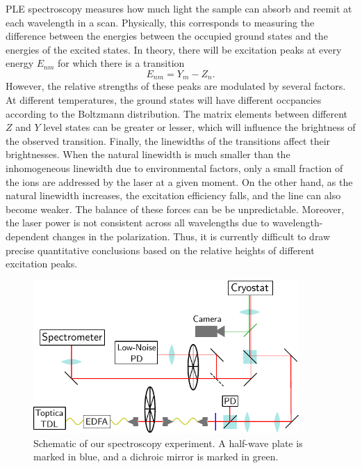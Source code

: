 \documentclass[12pt]{puthesis}
\begin{document}
PLE spectroscopy measures how much light the sample can absorb and reemit at each wavelength in a scan. Physically, this corresponds to measuring the difference between the energies between the occupied ground states and the energies of the excited states. In theory, there will be excitation peaks at every energy $E_{nm}$ for which there is a transition 
\begin{equation}\label{eq:6}
E_{nm} = Y_{m}-Z_{n}.
\end{equation}
However, the relative strengths of these peaks are modulated by several factors. At different temperatures, the ground states will have different occpancies according to the Boltzmann distribution. The matrix elements between different $Z$ and $Y$ level states can be greater or lesser, which will influence the brightness of the observed transition. Finally, the linewidths of the transitions affect their brightnesses. When the natural linewidth is much smaller than the inhomogeneous linewidth due to environmental factors, only a small fraction of the ions are addressed by the laser at a given moment. On the other hand, as the natural linewidth increases, the excitation efficiency falls, and the line can also become weaker. The balance of these forces can be be unpredictable. Moreover, the laser power is not consistent across all wavelengths due to wavelength-dependent changes in the polarization. Thus, it is currently difficult to draw precise quantitative conclusions based on the relative heights of different excitation peaks. 

\begin{figure}[t]
  \centering
  \includegraphics[width=0.9\textwidth]{PLESetupDiagram.pdf}
  \caption{Schematic of our spectroscopy experiment. A half-wave plate is marked in blue, and a dichroic mirror is marked in green. }
  \label{fig:ple}
\end{figure}
\end{document}
